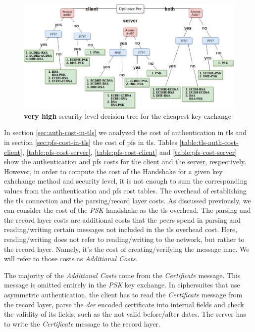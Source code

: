 \documentclass{llncs}
\begin{document}
\begin{figure}
  \centering
  \includegraphics[width=1.0\textwidth]{img/dt_veryhigh_sl.png}
  \centering \caption{\label{fig:dt-veryhigh-sl} \textbf{very high} security level decision tree for the cheapest key exchange}
\end{figure}

In section \ref{sec:auth-cost-in-tls} we analyzed the cost of authentication in \gls{tls} and in section \ref{sec:pfs-cost-in-tls}
the cost of \gls{pfs} in \gls{tls}. Tables \ref{table:tls-auth-cost-client}, \ref{table:pfs-cost-server},
\ref{table:pfs-cost-client} and \ref{table:pfs-cost-server} show the authentication and \gls{pfs} costs for the client and the server,
respectively. However, in order to compute the cost of the Handshake for a given key exhchange method and security level, it
is not enough to sum the corresponding values from the authentication and \gls{pfs} cost tables. The overhead of establishing the \gls{tls} connection and
the parsing/record layer costs. As discussed previously, we can consider the cost of the \textit{PSK} handshake as the \gls{tls} overhead.
The parsing and the record layer costs are additional costs that the
peers spend in parsing and reading/writing certain messages not included in the \gls{tls} overhead cost.
Here, reading/writing does not refer to reading/writing to the network, but rather to the record layer. Namely, it's the cost of creating/verifying
the message \gls{mac}. We will refer to those costs as \textit{Additional Costs}.

The majority of the \textit{Additional Costs} come from the \textit{Certificate} message.
This message is omitted entirely in the \textit{PSK} key exchange. In ciphersuites that use asymmetric authentication,
the client has to read the  \textit{Certificate} message from the record layer, parse the \textit{der} encoded certificate into internal fields and
check the validity of its fields, such as the not valid before/after dates. The server has to write the \textit{Certificate} message to the
record layer.
\end{document}
